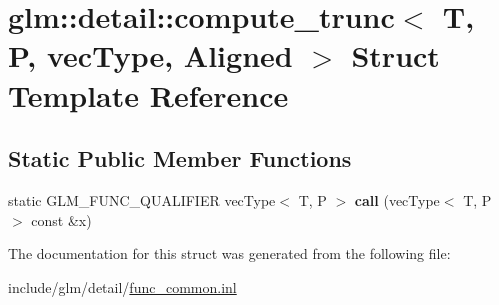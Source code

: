 \hypertarget{structglm_1_1detail_1_1compute__trunc}{}\section{glm\+:\+:detail\+:\+:compute\+\_\+trunc$<$ T, P, vec\+Type, Aligned $>$ Struct Template Reference}
\label{structglm_1_1detail_1_1compute__trunc}
\subsection*{Static Public Member Functions}
\begin{DoxyCompactItemize}
\item 
\mbox{\label{structglm_1_1detail_1_1compute__trunc_ae7b2394f1435078d22b8743b1b2725c9}} 
static G\+L\+M\+\_\+\+F\+U\+N\+C\+\_\+\+Q\+U\+A\+L\+I\+F\+I\+ER vec\+Type$<$ T, P $>$ {\bfseries call} (vec\+Type$<$ T, P $>$ const \&x)
\end{DoxyCompactItemize}


The documentation for this struct was generated from the following file\+:\begin{DoxyCompactItemize}
\item 
include/glm/detail/\hyperlink{func__common_8inl}{func\+\_\+common.\+inl}\end{DoxyCompactItemize}
